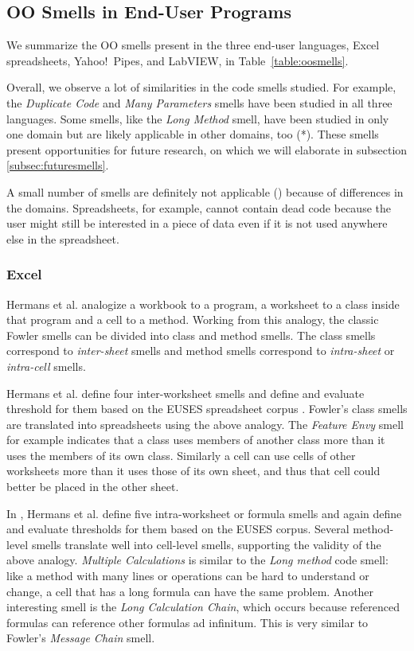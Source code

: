 \documentclass[10pt,conference,compsocconf]{IEEEtran}
\begin{document}
\subsection{OO Smells in End-User Programs}
 We summarize the OO smells present in the three end-user languages, Excel spreadsheets, Yahoo!\ Pipes, and LabVIEW, in Table~\ref{table:oosmells}.
 
 Overall, we observe a lot of similarities in the code smells studied. For example, the \emph{Duplicate Code} and \emph{Many Parameters} smells have been studied in all three languages. Some smells, like the \emph{Long Method} smell, have been studied in only one domain but are likely applicable in other domains, too (*). These smells present opportunities for future research, on which we will elaborate in subsection \ref{subsec:futuresmells}.
 
 A small number of smells are definitely not applicable () because of differences in the domains. Spreadsheets, for example, cannot contain dead code because the user might still be interested in a piece of data even if it is not used anywhere else in the spreadsheet.

 \subsubsection{Excel}
Hermans et al. \cite{Hermans2012inter} \cite{Hermans2012intra} analogize a workbook to a program, a worksheet to a class inside that program and a cell to a method.
Working from this analogy, the classic Fowler smells can be divided into class and method smells.
The class smells correspond to \textit{inter-sheet} smells and method smells correspond to \textit{intra-sheet} or \textit{intra-cell} smells.

Hermans et al. \cite{Hermans2012inter} define four inter-worksheet smells and define and evaluate threshold for them based on the EUSES spreadsheet corpus \cite{fisher2005euses}.
Fowler's class smells are translated into spreadsheets using the above analogy. 
The \textit{Feature Envy} smell for example indicates that a class uses members of another class more than it uses the members of its own class.
Similarly a cell can use cells of other worksheets more than it uses those of its own sheet, and thus that cell could better be placed in the other sheet.

In \cite{Hermans2012intra}, Hermans et al. define five intra-worksheet or formula smells and again define and evaluate thresholds for them based on the EUSES corpus.
Several method-level smells translate well into cell-level smells, supporting the validity of the above analogy.
\textit{Multiple Calculations} is similar to the \textit{Long method} code smell: like a method with many lines or operations can be hard to understand or change, a cell that has a long formula can have the same problem.
Another interesting smell is the \textit{Long Calculation Chain}, which occurs because referenced formulas can reference other formulas ad infinitum.
This is very similar to Fowler's \textit{Message Chain} smell.
\end{document}
